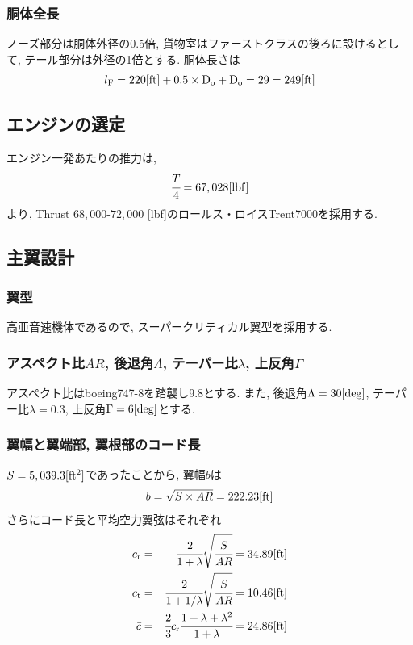 \documentclass[12pt]{jsarticle}
\begin{document}
\subsubsection{胴体全長}
ノーズ部分は胴体外径の0.5倍, 貨物室はファーストクラスの後ろに設けるとして, テール部分は外径の1倍とする. 胴体長さは
\begin{eqnarray*}
l_{\rm F} = 220[\rm ft] + 0.5 \times D_{\rm o} + D_{\rm o} = 29 = 249 [\rm ft] 
\end{eqnarray*}
\subsection{エンジンの選定}
エンジン一発あたりの推力は,
\begin{eqnarray*}
\cfrac{T}{4} = 67,028 [{\rm lbf}]
\end{eqnarray*}
より, Thrust $68,000$-$72,000$ [lbf]のロールス・ロイスTrent7000を採用する.
\subsection{主翼設計}
\subsubsection{翼型}
高亜音速機体であるので, スーパークリティカル翼型を採用する.

\subsubsection{アスペクト比$AR$, 後退角$\Lambda$, テーパー比$\lambda$, 上反角$\Gamma$}
アスペクト比はboeing747-8を踏襲し9.8とする. また, 後退角$\Lambda = 30 [{\rm deg}]$, テーパー比$\lambda = 0.3$, 上反角$\Gamma = 6 [{\rm deg}]$とする.

\subsubsection{翼幅と翼端部, 翼根部のコード長}
$S=5,039.3[{\rm ft^2}]$であったことから, 翼幅$b$は
\begin{eqnarray*}
b = \sqrt{S \times AR} = 222.23 [{\rm ft}]
\end{eqnarray*}
さらにコード長と平均空力翼弦はそれぞれ
\begin{eqnarray*}
c_{\rm r} &=& \cfrac{2}{1+\lambda}\sqrt{\cfrac{S}{AR}} = 34.89 [{\rm ft}] \\
c_{\rm t} &=& \cfrac{2}{1+1/\lambda}\sqrt{\cfrac{S}{AR}} = 10.46 [{\rm ft}] \\
\bar{c} &=& \cfrac{2}{3}c_{\rm r} \cfrac{1 + \lambda + \lambda^2}{1 + \lambda} = 24.86 [{\rm ft}]
\end{eqnarray*}
\end{document}

